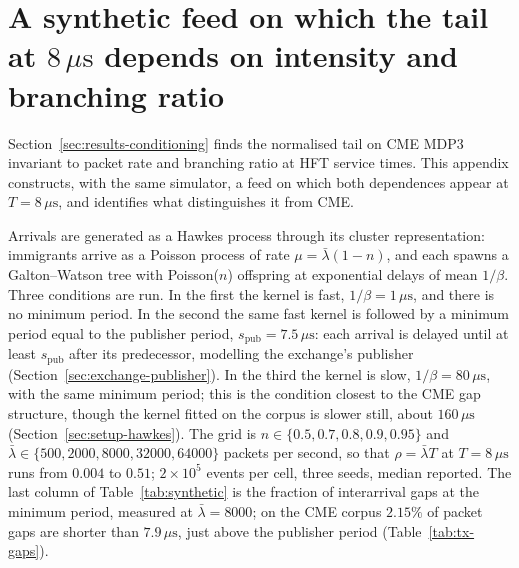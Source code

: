 \documentclass[11pt]{article}
\newcommand{\spub}{s_{\mathrm{pub}}}
\begin{document}
\section{A synthetic feed on which the tail at $8\,\mu\mathrm{s}$ depends on intensity and branching ratio}
\label{app:synthetic}

Section~\ref{sec:results-conditioning} finds the normalised tail on CME MDP3 invariant to
packet rate and branching ratio at HFT service times. This appendix constructs, with the
same simulator, a feed on which both dependences appear at $T = 8\,\mu\mathrm{s}$, and
identifies what distinguishes it from CME.

Arrivals are generated as a Hawkes process through its cluster representation:
immigrants arrive as a Poisson process of rate $\mu = \bar\lambda(1-n)$, and each spawns a
Galton--Watson tree with Poisson($n$) offspring at exponential delays of mean $1/\beta$.
Three conditions are run. In the first the kernel is fast, $1/\beta = 1\,\mu\mathrm{s}$,
and there is no minimum period. In the second the same fast kernel is followed by a
minimum period equal to the publisher period, $\spub = 7.5\,\mu\mathrm{s}$: each arrival is
delayed until at least $\spub$ after its predecessor, modelling the exchange's publisher
(Section~\ref{sec:exchange-publisher}). In the third the kernel is slow, $1/\beta =
80\,\mu\mathrm{s}$, with the same minimum period; this is the condition closest to the CME gap
structure, though the kernel fitted on the corpus is slower still, about $160\,\mu\mathrm{s}$
(Section~\ref{sec:setup-hawkes}). The grid is $n \in \{0.5, 0.7, 0.8, 0.9, 0.95\}$ and $\bar\lambda \in \{500,
2000, 8000, 32000, 64000\}$ packets per second, so that $\rho = \bar\lambda T$ at $T =
8\,\mu\mathrm{s}$ runs from $0.004$ to $0.51$; $2 \times 10^5$ events per cell, three
seeds, median reported. The last column of Table~\ref{tab:synthetic} is the fraction of interarrival gaps at
the minimum period, measured at $\bar\lambda = 8000$; on the CME corpus $2.15\%$ of packet
gaps are shorter than $7.9\,\mu\mathrm{s}$, just above the publisher period (Table~\ref{tab:tx-gaps}).
\end{document}
